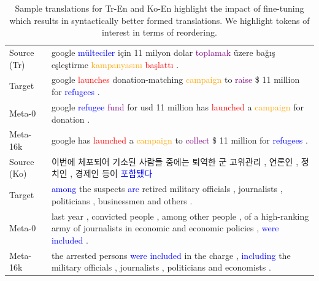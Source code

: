 \begin{table}[hptb]
\centering
\small
\begin{tabular}{p{}|p{}}
\toprule
Source (Tr) & google \textcolor{blue}{mülteciler} için 11 milyon dolar \textcolor{purple}{toplamak} üzere bağış eşleştirme \textcolor{orange}{kampanyasını} \textcolor{red}{başlattı} .\\
Target & google \textcolor{red}{launches} donation-matching \textcolor{orange}{campaign} to \textcolor{purple}{raise} \$ 11 million for \textcolor{blue}{refugees} .\\
Meta-0 & google \textcolor{blue}{refugee} \textcolor{purple}{fund} for usd 11 million has \textcolor{red}{launched} a \textcolor{orange}{campaign} for donation .\\
Meta-16k & google has \textcolor{red}{launched} a \textcolor{orange}{campaign} to \textcolor{purple}{collect} \$ 11 million for \textcolor{blue}{refugees} . \\
\midrule
Source (Ko) & 이번에 체포되어 기소된 사람들 중에는 퇴역한 군 고위관리 , 언론인 , 정치인 , 경제인 등이 \textcolor{blue}{포함됐다} \\
Target & \textcolor{blue}{among} the suspects \textcolor{blue}{are} retired military officials , journalists , politicians , businessmen and others .\\
Meta-0 & last year , convicted people , among other people , of a high-ranking army of journalists in economic and economic policies , \textcolor{blue}{were included} . \\
Meta-16k & the arrested persons \textcolor{blue}{were included} in the charge , \textcolor{blue}{including} the military officials , journalists , politicians and economists .\\
\bottomrule
\end{tabular}
\caption{\label{cp6.table.example}
Sample translations for Tr-En and Ko-En highlight the impact of fine-tuning which results in syntactically better formed translations. We highlight tokens of interest in terms of reordering.
}
\end{table}



